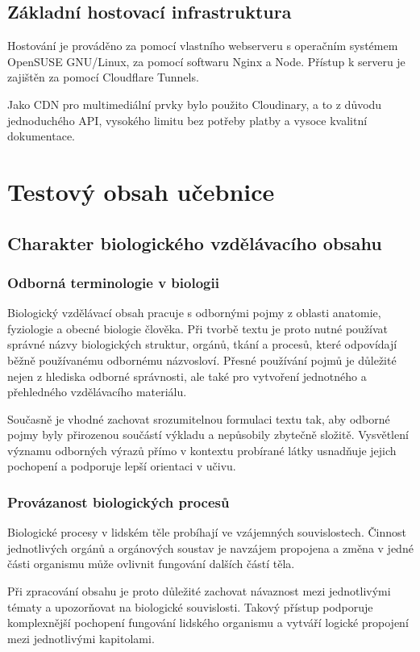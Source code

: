 \documentclass[12pt]{article}
\begin{document}
\subsection{Základní hostovací infrastruktura}

Hostování je prováděno za pomocí vlastního webserveru s operačním systémem OpenSUSE GNU/Linux, za pomocí softwaru Nginx a Node. Přístup k serveru je zajištěn za pomocí Cloudflare Tunnels.
\cite{Cloudflare}

Jako CDN pro multimediální prvky bylo použito Cloudinary, a to z důvodu jednoduchého API, vysokého limitu bez potřeby platby a vysoce kvalitní dokumentace. \cite{Cloudinary}

\newpage
\section{Testový obsah učebnice}
    \subsection{Charakter biologického vzdělávacího obsahu}
      \subsubsection{Odborná terminologie v biologii}
    Biologický vzdělávací obsah pracuje s odbornými pojmy z oblasti anatomie, fyziologie a obecné biologie člověka. Při tvorbě textu je proto nutné používat správné názvy biologických struktur, orgánů, tkání a procesů, které odpovídají běžně používanému odbornému názvosloví. Přesné používání pojmů je důležité nejen z hlediska odborné správnosti, ale také pro vytvoření jednotného a přehledného vzdělávacího materiálu.

    Současně je vhodné zachovat srozumitelnou formulaci textu tak, aby odborné pojmy byly přirozenou součástí výkladu a nepůsobily zbytečně složitě. Vysvětlení významu odborných výrazů přímo v kontextu probírané látky usnadňuje jejich pochopení a podporuje lepší orientaci v učivu.
      \subsubsection{Provázanost biologických procesů}
    Biologické procesy v lidském těle probíhají ve vzájemných souvislostech. Činnost jednotlivých orgánů a orgánových soustav je navzájem propojena a změna v jedné části organismu může ovlivnit fungování dalších částí těla.

    Při zpracování obsahu je proto důležité zachovat návaznost mezi jednotlivými tématy a upozorňovat na biologické souvislosti. Takový přístup podporuje komplexnější pochopení fungování lidského organismu a vytváří logické propojení mezi jednotlivými kapitolami.
\end{document}
